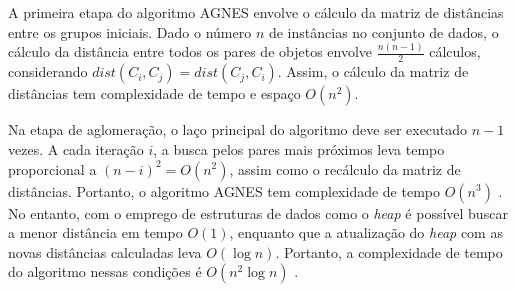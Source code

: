 A primeira etapa do algoritmo AGNES envolve o cálculo da matriz de distâncias
entre os grupos iniciais. Dado o número $n$ de instâncias no conjunto de dados,
o cálculo da distância entre todos os pares de objetos envolve
$ \frac{n \left(n-1\right)}{2}$ cálculos, considerando
$dist(C_i,C_j) = dist(C_j,C_i)$. Assim, o cálculo da matriz de distâncias
tem complexidade de tempo e espaço $O\left(n^2\right)$.

Na etapa de aglomeração, o laço principal do algoritmo deve ser executado $n-1$
vezes. A cada iteração $i$, a busca pelos pares mais próximos leva tempo 
proporcional a $\left(n-i\right)^2 = O\left(n^2\right)$, assim como o recálculo
da matriz de distâncias. Portanto, o algoritmo AGNES tem complexidade de tempo
$O\left(n^3\right)$ \cite{tan2009introducao}. No entanto, com o emprego de 
estruturas de dados como o \emph{heap} é possível buscar a menor distância em 
tempo $O\left(1\right)$, enquanto que a atualização do \emph{heap} com as novas
distâncias calculadas leva $O\left(\log{n}\right)$. Portanto, a complexidade de
tempo do algoritmo nessas condições é $O\left(n^2 \log{n}\right)$
\cite{zaki2014data}.